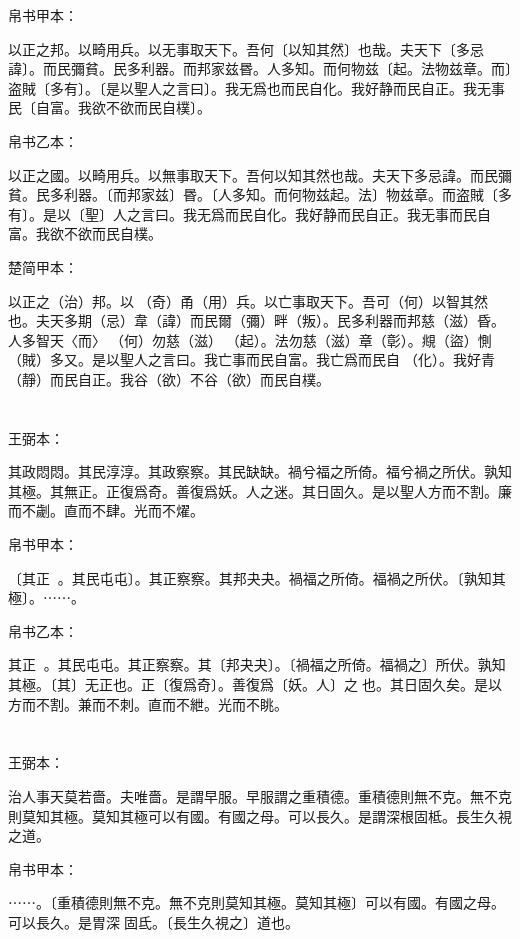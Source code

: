 \documentclass[a5paper]{ctexbook}
\begin{document}
    
    帛书甲本：

    以正之邦。以畸用兵。以无事取天下。吾何〔以知其然〕也哉。夫天下〔多忌諱〕。而民彌貧。民多利器。而邦家兹昬。人多知。而何物兹〔起。法物兹章。而〕盗賊〔多有〕。〔是以聖人之言曰〕。我无爲也而民自化。我好静而民自正。我无事民〔自富。我欲不欲而民自樸〕。

    帛书乙本：

    以正之國。以畸用兵。以無事取天下。吾何以知其然也哉。夫天下多忌諱。而民彌貧。民多利器。〔而邦家兹〕昬。〔人多知。而何物兹起。法〕物兹章。而盗賊〔多有〕。是以〔聖〕人之言曰。我无爲而民自化。我好静而民自正。我无事而民自富。我欲不欲而民自樸。

    楚简甲本：

    以正之（治）邦。以󶵊（奇）甬（用）兵。以亡事取天下。吾可（何）以智其然也。夫天多期（忌）韋（諱）而民爾（彌）畔（叛）。民多利器而邦慈（滋）昏。人多智天〈而〉𢦪（何）勿慈（滋）󶵋（起）。法勿慈（滋）章（彰）。覜（盜）惻（賊）多又。是以聖人之言曰。我亡事而民自富。我亡爲而民自󶵍（化）。我好青（靜）而民自正。我谷（欲）不谷（欲）而民自樸。

    \chapter{}
    王弼本：

    其政悶悶。其民淳淳。其政察察。其民缺缺。禍兮福之所倚。福兮禍之所伏。孰知其極。其無正。正復爲奇。善復爲妖。人之迷。其日固久。是以聖人方而不割。廉而不劌。直而不肆。光而不燿。

    
    帛书甲本：

    〔其正󱁅󱁅。其民屯屯〕。其正察察。其邦夬夬。禍福之所倚。福禍之所伏。〔孰知其極〕。⋯⋯。

    帛书乙本：

    其正󱁅󱁅。其民屯屯。其正察察。其〔邦夬夬〕。〔禍福之所倚。福禍之〕所伏。孰知其極。〔其〕无正也。正〔復爲奇〕。善復爲〔妖。人〕之𢘻也。其日固久矣。是以方而不割。兼而不刺。直而不紲。光而不眺。

    \chapter{}
    王弼本：

    治人事天莫若嗇。夫唯嗇。是謂早服。早服謂之重積德。重積德則無不克。無不克則莫知其極。莫知其極可以有國。有國之母。可以長久。是謂深根固柢。長生久視之道。

    
    帛书甲本：

    ⋯⋯。〔重積德則無不克。無不克則莫知其極。莫知其極〕可以有國。有國之母。可以長久。是胃深󱁆固氐。〔長生久視之〕道也。
\end{document}
